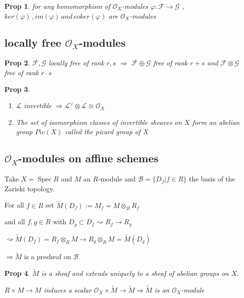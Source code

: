 \documentclass[a4paper, 12pt]{article}
\newcommand{\ca}[1]{\mathcal{#1}}
\newcommand{\caf}{\mathcal{F}}
\newcommand{\cag}{\mathcal{G}}
\newcommand{\oxmod}{$\mathcal{O}_X$-module }
\newcommand{\oxmods}{$\mathcal{O}_X$-modules }
\newcommand{\ox}{\mathcal{O}_X}
\newtheorem*{prop}{Prop}
\DeclareMathOperator{\spec}{Spec}
\begin{document}
	\begin{prop}
		for any homomorphism of \oxmods $ \varphi:\caf \rightarrow \cag $ ,
		$ ker(\varphi) \, ,  im(\varphi) \, and \, coker(\varphi)$ are \oxmods
	\end{prop}
		
	
	
	\subsection{locally free \oxmods}
	
	
	
	\begin{prop}
		$ \caf , \cag $ locally free of rank $ r,s $ $ \Rightarrow $ 
		$ \caf \oplus \cag $ free of rank $ r+s $ and $ \caf \otimes \cag $ free of rank $ r \cdot s $
	\end{prop}
	\begin{prop}
		
		
		\begin{enumerate}
			\item $ \ca{L} $ invertible $ \Rightarrow  \ca{L}^{\vee} \otimes \ca{L} \cong \ox $
			\item The set of isomorphism classes of invertible sheaves on $ X $ form an abelian group $ Pic(X) $ called the picard group of X
		\end{enumerate}
	\end{prop}
	
	
	
		
	\subsection{\oxmods on affine schemes}
	
	Take $ X= \spec R $ and $ M $ an $ R $-module and $ \ca{B} = \{D_f | f \in R\} $ the basis of the Zariski topology.
	
	For all $ f \in R $ set $ \tilde{M}(D_f) := M_f = M\otimes_R R_f $ 
	
	and all $ f,g \in R $ with $ D_g \subset D_f \rightsquigarrow R_f \rightarrow R_g $
	
	$ \rightsquigarrow \tilde{M}(D_f) = R_f \otimes_R M \rightarrow R_g \otimes_R M = \tilde{M}(D_g) $
	
	$ \Rightarrow \tilde{M} $ is a presheaf on $ \ca{B} $
	
	\begin{prop}
		$ \tilde{M} $ is a sheaf and extends uniquely to a sheaf of abelian groups on $ X $.
		
		$ R \times M \rightarrow M $ induces a scalar $ \ox \times \tilde{M} \rightarrow \tilde{M}  \Rightarrow \tilde{M}  $ is an \oxmod 
	\end{prop}
	
\end{document}
